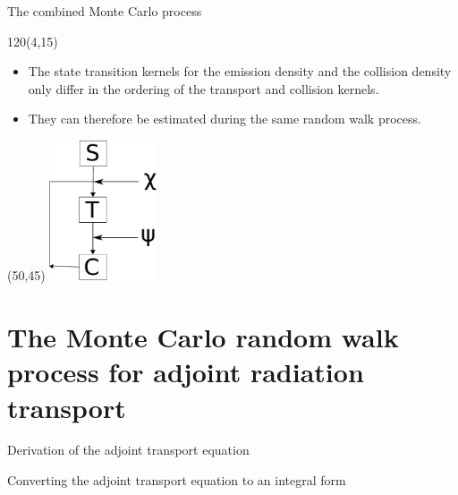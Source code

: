 \documentclass{beamer}
\begin{document}
\begin{frame}{The combined Monte Carlo process}

  \begin{textblock}{120}(4,15)
    \begin{itemize}
      \item The state transition kernels for the emission density and the
        collision density only differ in the ordering of the transport and
        collision kernels.
      \item They can therefore be estimated during the same random walk process.
    \end{itemize}
  \end{textblock}

  \begin{textblock}{20}(50,45)
    \includegraphics[width=1.25in]{../document/chapters/random_walk_process_derivation/random_walk_process.pdf}
  \end{textblock}

\end{frame}

\section{The Monte Carlo random walk process for adjoint radiation transport}
\begin{frame}{Derivation of the adjoint transport equation}

\end{frame}

\begin{frame}{Converting the adjoint transport equation to an integral form}

\end{frame}
\end{document}
